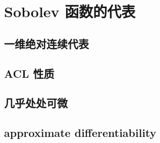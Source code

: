 \section{Sobolev 函数的代表}
\label{b1:sec:2104}


\subsection{一维绝对连续代表}
\label{b1:subsec:210401}

\subsection{ACL 性质}
\label{b1:subsec:210402}

\subsection{几乎处处可微}
\label{b1:subsec:210403}

\subsection{approximate differentiability}
\label{b1:subsec:210404}


